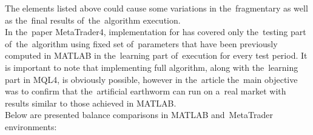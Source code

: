 \documentclass[runningheads,a4paper]{llncs}
\begin{document}
The elements listed above could cause some variations in the~fragmentary as well as the~final results of~the~algorithm execution.\\

In the~paper MetaTrader4, implementation for  has covered only the~testing part of~the~algorithm using fixed set of~parameters that have been previously computed in MATLAB in the~learning part of~execution for every test period. It is important to note that implementing full algorithm, along with the~learning part in MQL4, is obviously possible, however in the~article the~main objective was to confirm that the~artificial earthworm can run on a~real market with results similar to those achieved in MATLAB.\\

Below are presented balance comparisons in MATLAB and~MetaTrader environments:
\end{document}
